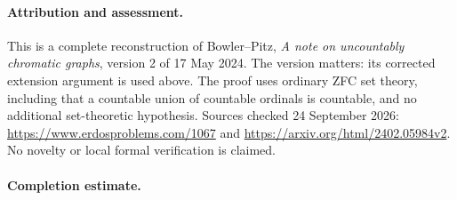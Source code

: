 \paragraph{Attribution and assessment.}
This is a complete reconstruction of Bowler--Pitz, \emph{A note on uncountably chromatic graphs}, version 2 of 17 May 2024. The version matters: its corrected extension argument is used above. The proof uses ordinary ZFC set theory, including that a countable union of countable ordinals is countable, and no additional set-theoretic hypothesis. Sources checked 24 September 2026: \url{https://www.erdosproblems.com/1067} and \url{https://arxiv.org/html/2402.05984v2}. No novelty or local formal verification is claimed.

\paragraph{Completion estimate.}
